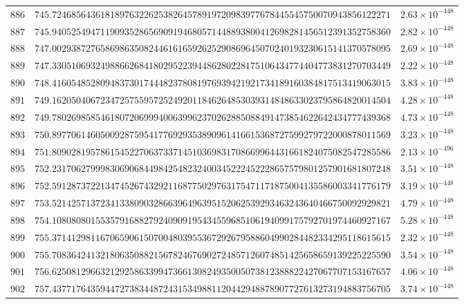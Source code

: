 \documentclass[12pt,reqno]{amsart}
\theoremstyle{remark}
\begin{document}
\begin{longtable}{clc}
$886$ & $745.7246856436181897632262538264578919720983977678445545750070943856122271$ & $2.63\times 10^{-448}$ \\
$887$ & $745.9405254947119093528656909194680571448893800412698281456512391352758360$ & $2.82\times 10^{-448}$ \\
$888$ & $747.0029387276586986350824461616592625290869645070240193230615141370578095$ & $2.69\times 10^{-448}$ \\
$889$ & $747.3305106932498866268418029522394486280228175106434774404773831270703449$ & $2.22\times 10^{-448}$ \\
$890$ & $748.4160548528094837301744482378081976939421921734189160384817513419063015$ & $3.83\times 10^{-448}$ \\
$891$ & $749.1620504067234725755957252492011846264853039314848633023795864820014504$ & $4.28\times 10^{-448}$ \\
$892$ & $749.7802698585461807206999400639962370262885088491473854622642434777439368$ & $4.73\times 10^{-448}$ \\
$893$ & $750.8977061460500928759541776929353890961416615368727599279722000878011569$ & $3.23\times 10^{-448}$ \\
$894$ & $751.8090281957861545227063733714510369831708669964431661824075082547285586$ & $2.13\times 10^{-496}$ \\
$895$ & $752.2317062799983069068449842548232400345222452228657579801257901681807248$ & $3.51\times 10^{-448}$ \\
$896$ & $752.5912873722134745267432921168775029763175471171875004135586003341776179$ & $3.19\times 10^{-448}$ \\
$897$ & $753.5214257137234133809032866396496395152062539293463243640466750092929821$ & $4.79\times 10^{-448}$ \\
$898$ & $754.1080808015535791688279240909195434559685106194099175792701974460927167$ & $5.28\times 10^{-448}$ \\
$899$ & $755.3714129811670659061507004803955367292679588604990284482334295118615615$ & $2.32\times 10^{-448}$ \\
$900$ & $755.7083642413218063508821567824676902724857126074851425658659139225225590$ & $3.54\times 10^{-448}$ \\
$901$ & $756.6250812966321292586339947366130824935005073812388822427067707153167657$ & $4.06\times 10^{-448}$ \\
$902$ & $757.4377176435944727383448724315349881120442948878907727613273194883756705$ & $3.74\times 10^{-448}$ \\

\end{longtable}
\end{document}
